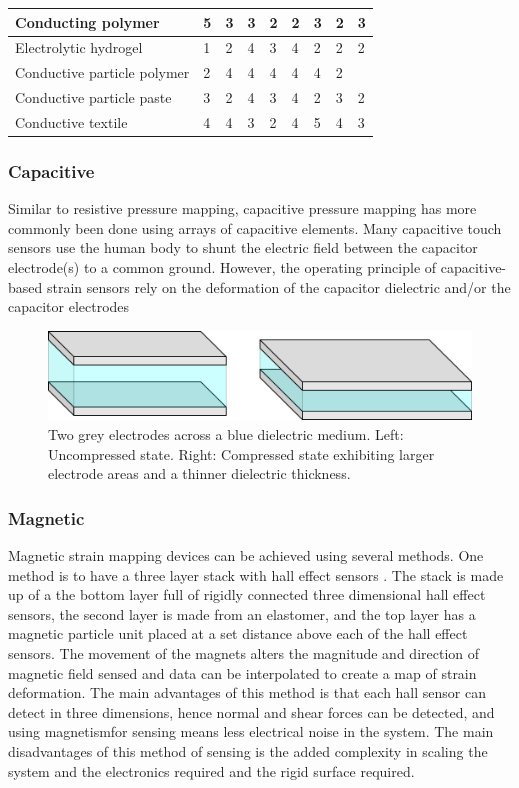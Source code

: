 \begin{table}[H]
\begin{tabular}{|p{2cm}|p{1cm}|p{1cm}|p{1cm}|p{1cm}|p{1cm}|p{1cm}|p{1cm}|p{1cm}|}
			Conducting polymer & 5 & 3 & 3 & 2 & 2 & 3 & 2 & 3 \\ \hline
			Electrolytic hydrogel & 1 & 2 & 4 & 3 & 4 & 2 & 2 & 2   \\ \hline
			Conductive particle polymer & 2 & 4 & 4 & 4 & 4 & 4 & 2 &  \\ \hline
			Conductive particle paste & 3 & 2 & 4 & 3 & 4 & 2 & 3 & 2  \\ \hline
			Conductive textile & 4 & 4 & 3 & 2 & 4 & 5 & 4 & 3  \\ \hline
		\end{tabular}
\end{table}

\subsubsection{Capacitive}
Similar to resistive pressure mapping, capacitive pressure mapping has more commonly been done using arrays of capacitive elements. Many capacitive touch sensors use the human body to shunt the electric field between the capacitor electrode(s) to a common ground. However, the operating principle of capacitive-based strain sensors rely on the deformation of the capacitor dielectric and/or the capacitor electrodes \cite{Sapra,Zhu2021,Liang2015}
\begin{figure}[H]
	\centering
	\includegraphics[width=0.6\linewidth]{Figures/cap_deformed_states_x2_crop.png}
	\caption{Two grey electrodes across a blue dielectric medium. Left: Uncompressed state. Right: Compressed state exhibiting larger electrode areas and a thinner dielectric thickness.}
	\label{fig:cap_deformed_cube}
\end{figure}

\subsubsection{Magnetic}
Magnetic strain mapping devices can be achieved using several methods. One method is to have a three layer stack with hall effect sensors \cite{Yan2021}. The stack is made up of a the bottom layer full of rigidly connected three dimensional hall effect sensors, the second layer is made from an elastomer, and the top layer has a magnetic particle unit placed at a set distance above each of the hall effect sensors. The movement of the magnets alters the magnitude and direction of magnetic field sensed and data can be interpolated to create a map of strain deformation. The main advantages of this method is that each hall sensor can detect in three dimensions, hence normal and shear forces can be detected, and using magnetismfor sensing means less electrical noise in the system. The main disadvantages of this method of sensing is the added complexity in scaling the system and the electronics required and the rigid surface required.  

